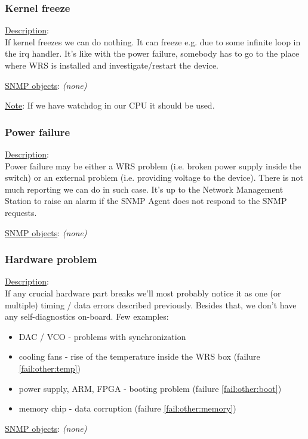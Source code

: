 \subsubsection{\bf Kernel freeze}
		\begin{packed_enum}
			\item [] \underline{Description}:\\
				If kernel freezes we can do nothing. It can freeze e.g. due to some
				infinite loop in the irq handler. It's like with the power failure,
				somebody has to go to the place where WRS is installed and
				investigate/restart the device.
			\item [] \underline{SNMP objects}: \emph{(none)}
			\item [] \underline{Note}:
				If we have watchdog in our CPU it should be used.
		\end{packed_enum}

\subsubsection{\bf Power failure}
		\begin{packed_enum}
			\item [] \underline{Description}:\\
				Power failure may be either a WRS problem (i.e. broken power supply
				inside the switch) or an external problem (i.e. providing voltage to the
				device). There is not much reporting we can do in such case. It's up to
				the Network Management Station to raise an alarm if the SNMP Agent does
				not respond to the SNMP requests.
			\item [] \underline{SNMP objects}: \emph{(none)}
		\end{packed_enum}

\subsubsection{\bf Hardware problem}
		\begin{packed_enum}
			\item [] \underline{Description}:\\
				If any crucial hardware part breaks we'll most probably notice it as one
				(or multiple) timing / data errors described previously. Besides that,
				we don't have any self-diagnostics on-board. Few examples:
				\begin{itemize}
					\item DAC / VCO - problems with synchronization
					\item cooling	fans - rise of the temperature inside the WRS box
						(failure \ref{fail:other:temp})
					\item power supply, ARM, FPGA - booting problem (failure
						\ref{fail:other:boot})
					\item memory chip - data corruption (failure \ref{fail:other:memory})
				\end{itemize}
			\item [] \underline{SNMP objects}: \emph{(none)}
		\end{packed_enum}

